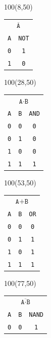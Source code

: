 \documentclass[aspectratio=169]{beamer}
\begin{document}
\begin{frame}[fragile,t]
    \begin{textblock}{100}(8,50)
    \begin{tabular}{c|c}
    \multicolumn{2}{c}{\textcolor{naranjauca}{ $\overline{\texttt{A}}$ } } \\
    \texttt{A} & \texttt{NOT} \\
    \hline
    \texttt{0} & \texttt{1} \\
    \texttt{1} & \texttt{0} \\
    \end{tabular}
    \end{textblock}
    \begin{textblock}{100}(28,50)
    \begin{tabular}{cc|c}
    \multicolumn{3}{c}{\textcolor{naranjauca}{ $\texttt{A}\cdot\texttt{B}$ } } \\
    \texttt{A} & \texttt{B} & \texttt{AND} \\
    \hline
    \texttt{0} & \texttt{0} & \texttt{0} \\
    \texttt{0} & \texttt{1} & \texttt{0} \\
    \texttt{1} & \texttt{0} & \texttt{0} \\
    \texttt{1} & \texttt{1} & \texttt{1} \\
    \end{tabular}
    \end{textblock}
    \begin{textblock}{100}(53,50)
    \begin{tabular}{cc|c}
    \multicolumn{3}{c}{\textcolor{naranjauca}{ $\texttt{A}+\texttt{B}$ } } \\
    \texttt{A} & \texttt{B} & \texttt{OR} \\
    \hline
    \texttt{0} & \texttt{0} & \texttt{0} \\
    \texttt{0} & \texttt{1} & \texttt{1} \\
    \texttt{1} & \texttt{0} & \texttt{1} \\
    \texttt{1} & \texttt{1} & \texttt{1} \\
    \end{tabular}
    \end{textblock}
    \begin{textblock}{100}(77,50)
    \begin{tabular}{cc|c}
    \multicolumn{3}{c}{\textcolor{naranjauca}{ $\overline{\texttt{A}\cdot\texttt{B}}$ } } \\
    \texttt{A} & \texttt{B} & \texttt{NAND} \\
    \hline
    \texttt{0} & \texttt{0} & \texttt{1} \\

\end{tabular}
\end{textblock}
\end{frame}
\end{document}
